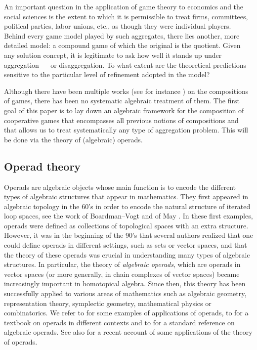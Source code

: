 \documentclass[a4paper,12pt]{amsart}
\begin{document}
\vspace{1pc}

\begin{quoting}[leftmargin=1cm, rightmargin=1cm]
An important question in the application of game theory to economics and the social sciences is the extent to which it is permissible to treat firms, committees, political parties, labor unions, etc., as though they were individual players. Behind every game model played by such aggregates, there lies another, more detailed model: a compound game of which the original is the quotient. Given any solution concept, it is legitimate to ask how well it stands up under aggregation --- or disaggregation. To what extent are the theoretical predictions sensitive to the particular level of refinement adopted in the model?
\end{quoting}

\vspace{1pc}

Although there have been multiple works (see for instance \cite{OwenMultilinear, MegiddoKernel, MegiddoNucleolus, megiddo1975tensor}) on the compositions of games, there has been no systematic algebraic treatment of them. The first goal of this paper is to lay down an algebraic framework for the composition of cooperative games that encompasses all previous notions of compositions and that allows us to treat systematically any type of aggregation problem. This will be done via the theory of (algebraic) operads. 

\subsection*{Operad theory}
Operads are algebraic objects whose main function is to encode the different types of algebraic structures that appear in mathematics. They first appeared in algebraic topology in the 60's in order to encode the natural structure of iterated loop spaces, see the work of Boardman--Vogt \cite{BoardmanVogt73} and of May \cite{May72}. In these first examples, operads were defined as collections of topological spaces with an extra structure. However, it was in the beginning of the 90's that several authors realized that one could define operads in different settings, such as sets or vector spaces, and that the theory of these operads was crucial in understanding many types of algebraic structures. In particular, the theory of \textit{algebraic operads}, which are operads in vector spaces (or more generally, in chain complexes of vector spaces) became increasingly important in homotopical algebra. Since then, this theory has been successfully applied to various areas of mathematics such as algebraic geometry, representation theory, symplectic geometry, mathematical physics or combinatorics. We refer to \cite{Renaissance} for some examples of applications of operads, to \cite{MarklStasheff} for a textbook on operads in different contexts and to \cite{LodayVallette} for a standard reference on algebraic operads. See also \cite{OperadicCalculus} for a recent account of some applications of the theory of operads. 
\end{document}
